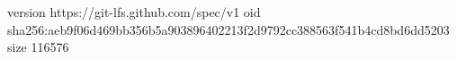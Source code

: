 version https://git-lfs.github.com/spec/v1
oid sha256:aeb9f06d469bb356b5a903896402213f2d9792cc388563f541b4cd8bd6dd5203
size 116576
